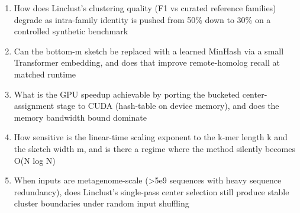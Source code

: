 \begin{enumerate}[leftmargin=1.6em,itemsep=0.2em,topsep=0.2em,label=Q\arabic*.]
\item How does Linclust's clustering quality (F1 vs curated reference families) degrade as intra-family identity is pushed from 50\% down to 30\% on a controlled synthetic benchmark
\item Can the bottom-m sketch be replaced with a learned MinHash via a small Transformer embedding, and does that improve remote-homolog recall at matched runtime
\item What is the GPU speedup achievable by porting the bucketed center-assignment stage to CUDA (hash-table on device memory), and does the memory bandwidth bound dominate
\item How sensitive is the linear-time scaling exponent to the k-mer length k and the sketch width m, and is there a regime where the method silently becomes O(N log N)
\item When inputs are metagenome-scale (\textgreater{}5e9 sequences with heavy sequence redundancy), does Linclust's single-pass center selection still produce stable cluster boundaries under random input shuffling
\end{enumerate}

